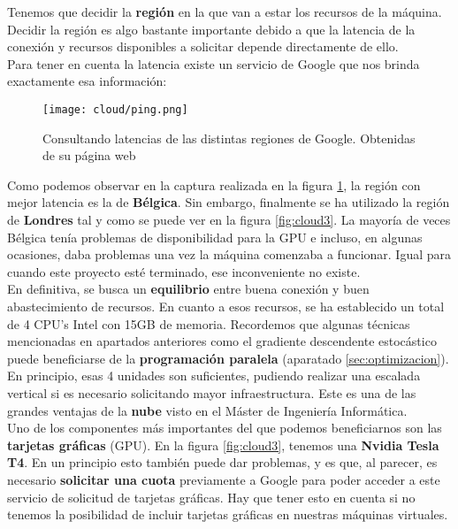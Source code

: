 \documentclass[11pt,fleqn]{book} %
\begin{document}
Tenemos que decidir la \textbf{región} en la que van a estar los recursos de la máquina. Decidir la región es algo bastante importante debido a que la latencia de la conexión y recursos disponibles a solicitar depende directamente de ello. \\

Para tener en cuenta la latencia existe un servicio de Google que nos brinda exactamente esa información:

\begin{figure}[H]
	\centering\texttt{[image: cloud/ping.png]}
	\caption{Consultando latencias de las distintas regiones de Google. Obtenidas de su página web \cite{article:ping}}
	\label{fig:cloudping} %
\end{figure}

Como podemos observar en la captura realizada en la figura \ref{fig:cloudping}, la región con mejor latencia es la de \textbf{Bélgica}. Sin embargo, finalmente se ha  utilizado la región de \textbf{Londres} tal y como se puede ver en la figura \ref{fig:cloud3}. La mayoría de veces Bélgica tenía problemas de disponibilidad para la GPU e incluso, en algunas ocasiones, daba problemas una vez la máquina comenzaba a funcionar. Igual para cuando este proyecto esté terminado, ese inconveniente no existe. \\

En definitiva, se busca un \textbf{equilibrio} entre buena conexión y buen abastecimiento de recursos. En cuanto a esos recursos, se ha establecido un total de 4 CPU's Intel con 15GB de memoria. Recordemos que algunas técnicas mencionadas en apartados anteriores como el gradiente descendente estocástico puede beneficiarse de la \textbf{programación paralela} (aparatado \ref{sec:optimizacion}). En principio,  esas 4 unidades son suficientes, pudiendo realizar una escalada vertical si es necesario solicitando mayor infraestructura. Este es una de las grandes ventajas de la \textbf{nube} visto en el Máster de Ingeniería Informática. \\

Uno de los componentes más importantes del que podemos beneficiarnos son las \textbf{tarjetas gráficas} (GPU). En la figura \ref{fig:cloud3}, tenemos una \textbf{Nvidia Tesla T4}. En un principio esto también puede dar problemas, y es que, al parecer, es necesario \textbf{solicitar una cuota} previamente a Google para poder acceder a este servicio de solicitud de tarjetas gráficas. Hay que tener esto en cuenta si no tenemos la posibilidad de incluir tarjetas gráficas en nuestras máquinas virtuales.\cite{article:cuota} \\
\end{document}

